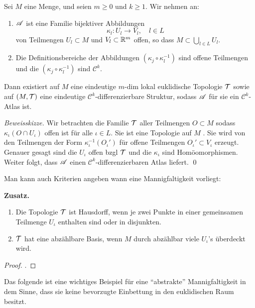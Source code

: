 \begin{satz}
\begin{mdframed}
Sei $M$ eine Menge, und seien $m\geq 0$ und $k\geq 1$. Wir nehmen an:
\begin{enumerate}
	\item $\AA$ ist eine Familie bijektiver Abbildungen
	$$\kappa_l:U_l\longrightarrow V_l,\quad l \in L$$
	von Teilmengen $U_l \subset M$ und $V_l\subset \R^m$ offen, so dass $M\subset \bigcup\limits_{l \in L} U_l$.
	\item Die Definitionsbereiche der Abbildungen $(\kappa_j \circ \kappa_l^{-1})$ sind offene Teilmengen und die $(\kappa_j\circ \kappa_l^{-1})$ sind $\mathcal{C}^k$.
\end{enumerate}
Dann existiert auf $M$ eine eindeutige $m$-dim lokal euklidische Topologie $\TT$ sowie auf $(M,\TT)$ eine eindeutige $\mathcal{C}^k$-differenzierbare Struktur, sodass $\AA$ für sie ein $\mathcal{C}^k$-Atlas ist.
\end{mdframed}
\textit{Beweisskizze.} Wir betrachten die Familie $\TT$ aller Teilmengen $O\subset M$ sodass $\kappa_\iota(O\cap U_\iota)$ offen ist für alle $\iota \in L$. Sie ist eine Topologie auf $M$ \Ueb . Sie wird von den Teilmengen der Form $\kappa_\iota^{-1}(O_\iota')$ für offene Teilmengen $O_\iota' \subset V_\iota$ erzeugt. Genauer gesagt sind die $U_\iota$ offen bzgl $\TT$ und die $\kappa_\iota$ sind Homöomorphismen. Weiter folgt, dass $\AA$ einen $\mathcal{C}^k$-differenzierbaren Atlas liefert. \qed
\end{satz}
Man kann auch Kriterien angeben wann eine Mannigfaltigkeit vorliegt:
\begin{mdframed}
\textbf{Zusatz.}
\begin{enumerate}
\item Die Topologie $\TT$ ist Hausdorff, wenn je zwei Punkte in einer gemeinsamen Teilmenge $U_\iota$ enthalten sind oder in disjunkten.
\item $\TT$ hat eine abzählbare Basis, wenn $M$ durch abzählbar viele $U_\iota$'s überdeckt wird.
\end{enumerate}
\end{mdframed}
\begin{proof}
\Ueb .
\end{proof}
Das folgende ist eine wichtiges Beispiel für eine ``abstrakte'' Mannigfaltigkeit in dem Sinne, dass sie keine bevorzugte  Einbettung in den euklidischen Raum besitzt.

